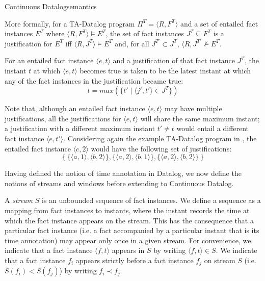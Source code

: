 \begin{nestedsection}{Continuous Datalog}{semantics}
\begin{definition}
More formally, for a TA-Datalog program $\Pi^T = \langle R, F^T \rangle$
and a set of entailed fact instances $E^T$ where $\langle R, F^T \rangle \models E^T$, the set of fact instances $J^T \subseteq F^T$ is a justification for
$E^T$ iff $\langle R, J^T \rangle \models E^T$ and, for all $J^{T\prime} \subset J^T$, $\langle R, J^{T\prime} \not\models E^T$.

For an entailed fact instance $\langle e, t\rangle$ and a
justification of that fact instance $J^T$, the instant $t$ at which
$\langle e, t \rangle$ becomes true is taken to be the latest instant
at which any of the fact instances in the justification became true:
\[ t = max(\{ t' \mid \langle j', t' \rangle \in J^T \}) \]

Note that, although an entailed fact instance $\langle e, t\rangle$
may have multiple justifications, all the justifications for $\langle
e, t \rangle$ will share the same maximum instant; a justification
with a different maximum instant $t' \neq t$ would entail a different
fact instance $\langle e, t' \rangle$. Considering again the example
TA-Datalog program in ,
the entailed fact instance $\langle c, 2 \rangle$ would have the
following set of justifications:
\[
  \{ \ \{ \langle a, 1 \rangle, \langle b, 2 \rangle \},  \{ \langle a, 2 \rangle, \langle b, 1 \rangle \},  \{ \langle a, 2 \rangle, \langle b, 2 \rangle \} \  \}
\]

\end{definition}

Having defined the notion of time annotation in Datalog, we now define
the notions of streams and windows before extending to Continuous Datalog.

\begin{definition}[Streams]

A {\em stream} $S$ is an unbounded sequence of fact instances. We
define a sequence as a mapping from fact instances to instants, where
the instant records the time at which the fact instance appears on the
stream. This has the consequence that a particular fact instance
(i.e. a fact accompanied by a particular instant that is its time
annotation) may appear only once in a given stream. For convenience,
we indicate that a fact instance $\langle f, t\rangle$ appears in $S$
by writing $\langle f, t \rangle \in S$. We indicate that a fact
instance $f_i$ appears strictly before a fact instance $f_j$ on stream
$S$ (i.e. $S(f_i) < S(f_j)$) by writing $f_i \prec f_j$.


\end{definition}
\end{nestedsection}
